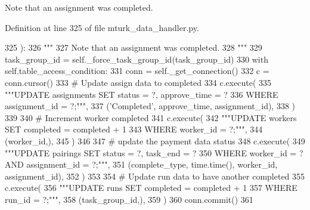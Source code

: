 \begin{DoxyVerb}Note that an assignment was completed.
\end{DoxyVerb}
 

Definition at line 325 of file mturk\+\_\+data\+\_\+handler.\+py.


\begin{DoxyCode}
325     ):
326         \textcolor{stringliteral}{"""}
327 \textcolor{stringliteral}{        Note that an assignment was completed.}
328 \textcolor{stringliteral}{        """}
329         task\_group\_id = self.\_force\_task\_group\_id(task\_group\_id)
330         with self.table\_access\_condition:
331             conn = self.\_get\_connection()
332             c = conn.cursor()
333             \textcolor{comment}{# Update assign data to completed}
334             c.execute(
335                 \textcolor{stringliteral}{"""UPDATE assignments SET status = ?, approve\_time = ?}
336 \textcolor{stringliteral}{                         WHERE assignment\_id = ?;"""},
337                 (\textcolor{stringliteral}{'Completed'}, approve\_time, assignment\_id),
338             )
339 
340             \textcolor{comment}{# Increment worker completed}
341             c.execute(
342                 \textcolor{stringliteral}{"""UPDATE workers SET completed = completed + 1}
343 \textcolor{stringliteral}{                         WHERE worker\_id = ?;"""},
344                 (worker\_id,),
345             )
346 
347             \textcolor{comment}{# update the payment data status}
348             c.execute(
349                 \textcolor{stringliteral}{"""UPDATE pairings SET status = ?, task\_end = ?}
350 \textcolor{stringliteral}{                         WHERE worker\_id = ? AND assignment\_id = ?;"""},
351                 (complete\_type, time.time(), worker\_id, assignment\_id),
352             )
353 
354             \textcolor{comment}{# Update run data to have another completed}
355             c.execute(
356                 \textcolor{stringliteral}{"""UPDATE runs SET completed = completed + 1}
357 \textcolor{stringliteral}{                         WHERE run\_id = ?;"""},
358                 (task\_group\_id,),
359             )
360             conn.commit()
361 
\end{DoxyCode}
\mbox{\label{classparlai_1_1mturk_1_1core_1_1legacy__2018_1_1mturk__data__handler_1_1MTurkDataHandler_a79e0ff8d37c8df05b532a38f6eddb1e5}} 
